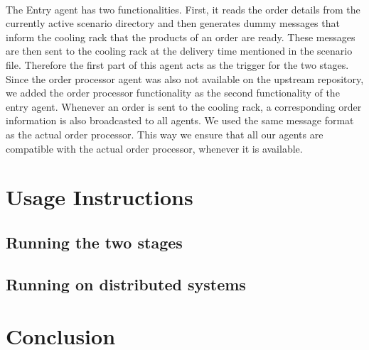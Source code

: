 \documentclass[11pt, a4paper]{article}
\begin{document}
\paragraph{}
The Entry agent has two functionalities. First, it reads the order details from the currently active scenario directory and then generates dummy messages that inform the cooling rack that the products of an order are ready. These messages are then sent to the cooling rack at the delivery time mentioned in the scenario file. Therefore the first part of this agent acts as the trigger for the two stages. Since the order processor agent was also not available on the upstream repository, we added the order processor functionality as the second functionality of the entry agent. Whenever an order is sent to the cooling rack, a corresponding order information is also broadcasted to all agents. We used the same  message format as the actual order processor. This way we ensure that all our agents are compatible with the actual order processor, whenever it is available.

\section{Usage Instructions}

\subsection{Running the two stages}

\subsection{Running on distributed systems}

\section{Conclusion}
\end{document}
